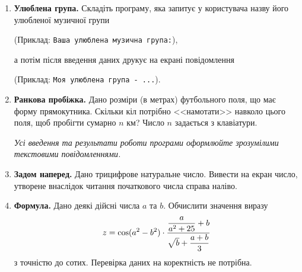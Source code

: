 \begin{enumerate}

\item \textbf{Улюблена група.} Складіть програму, яка запитує у користувача назву його улюбленої музичної групи

(Приклад: \verb|Ваша улюблена музична група:|),

а потім після введення даних друкує на екрані повідомлення

(Приклад: \verb|Моя улюблена група - ...|).

\item \textbf{Ранкова пробіжка.} Дано розміри (в метрах) футбольного поля, що має форму прямокутника. Скільки кіл потрібно <<намотати>> навколо цього поля, щоб пробігти сумарно $n$ км? Число $n$ задається з клавіатури.

{\itshape Усі введення та результати роботи програми оформлюйте зрозумілими текстовими повідомленнями.}

\item \textbf{Задом наперед.} Дано трицифрове натуральне число. Вивести на екран число, утворене внаслідок читання початкового числа справа наліво.

\item \textbf{Формула.} Дано деякі дійсні числа $a$ та $b$. Обчислити значення виразу
$$
z=\cos(a^2-b^2)\cdot\dfrac{\dfrac{a}{a^2+25}+b}{\sqrt{\mathstrut b}+\dfrac{a+b}{ 3}}
$$
з точністю до сотих. Перевірка даних на коректність не потрібна.
\end{enumerate}




